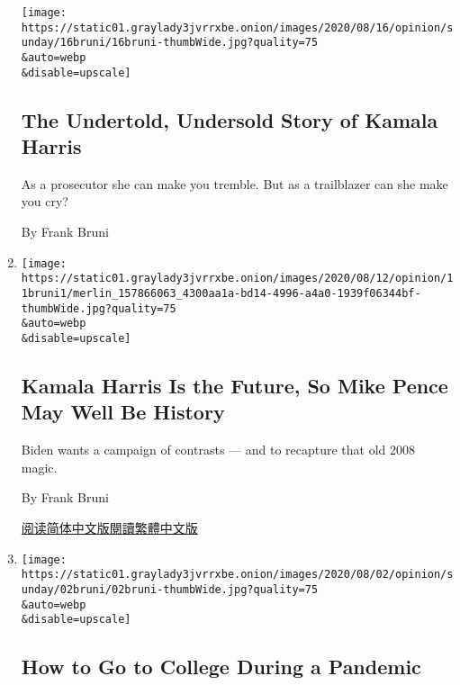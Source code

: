 \begin{enumerate}
  \texttt{[image: https://static01.graylady3jvrrxbe.onion/images/2020/08/16/opinion/sunday/16bruni/16bruni-thumbWide.jpg?quality=75\\\&auto=webp\\\&disable=upscale]}

  \hypertarget{the-undertold-undersold-story-of-kamala-harris}{%
  \subsection{The Undertold, Undersold Story of Kamala
  Harris}\label{the-undertold-undersold-story-of-kamala-harris}}

  As a prosecutor she can make you tremble. But as a trailblazer can she
  make you cry?

  By Frank Bruni
\item
  \href{/2020/08/11/opinion/kamala-harris-biden-running-mate.html}{}

  \texttt{[image: https://static01.graylady3jvrrxbe.onion/images/2020/08/12/opinion/11bruni1/merlin\_157866063\_4300aa1a-bd14-4996-a4a0-1939f06344bf-thumbWide.jpg?quality=75\\\&auto=webp\\\&disable=upscale]}

  \hypertarget{kamala-harris-is-the-future-so-mike-pence-may-well-be-history}{%
  \subsection{Kamala Harris Is the Future, So Mike Pence May Well Be
  History}\label{kamala-harris-is-the-future-so-mike-pence-may-well-be-history}}

  Biden wants a campaign of contrasts --- and to recapture that old 2008
  magic.

  By Frank Bruni

  \href{https://cn.nytimes3xbfgragh.onion/opinion/20200812/kamala-harris-biden-running-mate/}{阅读简体中文版}\href{https://cn.nytimes3xbfgragh.onion/opinion/20200812/kamala-harris-biden-running-mate/zh-hant/}{閱讀繁體中文版}
\item
  \href{/2020/08/01/opinion/sunday/minerva-college-coronavirus.html}{}

  \texttt{[image: https://static01.graylady3jvrrxbe.onion/images/2020/08/02/opinion/sunday/02bruni/02bruni-thumbWide.jpg?quality=75\\\&auto=webp\\\&disable=upscale]}

  \hypertarget{how-to-go-to-college-during-a-pandemic}{%
  \subsection{How to Go to College During a
  Pandemic}\label{how-to-go-to-college-during-a-pandemic}}


\end{enumerate}
